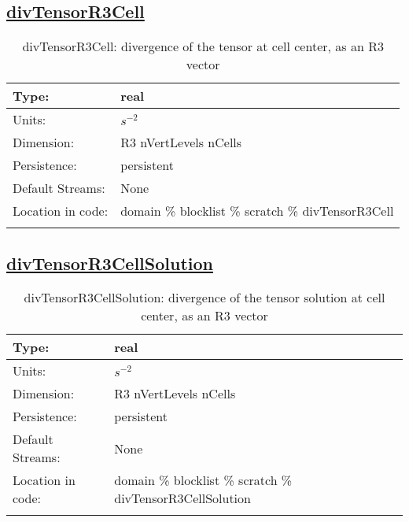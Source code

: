 \subsection[divTensorR3Cell]{\hyperref[sec:var_tab_scratch]{divTensorR3Cell}}
\label{subsec:var_sec_scratch_divTensorR3Cell}
\begin{center}
\begin{longtable}{| p{2.0in} | p{4.0in} |}
        \hline 
        Type: & real \\
        \hline 
        Units: & $s^{-2}$ \\
        \hline 
        Dimension: & R3 nVertLevels nCells \\
        \hline 
        Persistence: & persistent \\
        \hline 
		 Default Streams: & None \\
        \hline 
		 Location in code: & domain \% blocklist \% scratch \% divTensorR3Cell \\
		 \hline 
    \caption{divTensorR3Cell: divergence of the tensor at cell center, as an R3 vector}
\end{longtable}
\end{center}
\subsection[divTensorR3CellSolution]{\hyperref[sec:var_tab_scratch]{divTensorR3CellSolution}}
\label{subsec:var_sec_scratch_divTensorR3CellSolution}
\begin{center}
\begin{longtable}{| p{2.0in} | p{4.0in} |}
        \hline 
        Type: & real \\
        \hline 
        Units: & $s^{-2}$ \\
        \hline 
        Dimension: & R3 nVertLevels nCells \\
        \hline 
        Persistence: & persistent \\
        \hline 
		 Default Streams: & None \\
        \hline 
		 Location in code: & domain \% blocklist \% scratch \% divTensorR3CellSolution \\
		 \hline 
    \caption{divTensorR3CellSolution: divergence of the tensor solution at cell center, as an R3 vector}
\end{longtable}
\end{center}
